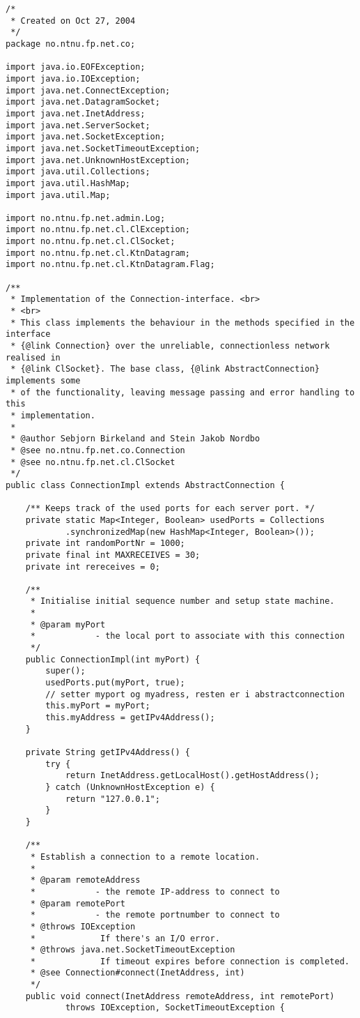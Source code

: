 \begin{lstlisting}
/*
 * Created on Oct 27, 2004
 */
package no.ntnu.fp.net.co;

import java.io.EOFException;
import java.io.IOException;
import java.net.ConnectException;
import java.net.DatagramSocket;
import java.net.InetAddress;
import java.net.ServerSocket;
import java.net.SocketException;
import java.net.SocketTimeoutException;
import java.net.UnknownHostException;
import java.util.Collections;
import java.util.HashMap;
import java.util.Map;

import no.ntnu.fp.net.admin.Log;
import no.ntnu.fp.net.cl.ClException;
import no.ntnu.fp.net.cl.ClSocket;
import no.ntnu.fp.net.cl.KtnDatagram;
import no.ntnu.fp.net.cl.KtnDatagram.Flag;

/**
 * Implementation of the Connection-interface. <br>
 * <br>
 * This class implements the behaviour in the methods specified in the interface
 * {@link Connection} over the unreliable, connectionless network realised in
 * {@link ClSocket}. The base class, {@link AbstractConnection} implements some
 * of the functionality, leaving message passing and error handling to this
 * implementation.
 * 
 * @author Sebjorn Birkeland and Stein Jakob Nordbo
 * @see no.ntnu.fp.net.co.Connection
 * @see no.ntnu.fp.net.cl.ClSocket
 */
public class ConnectionImpl extends AbstractConnection {

	/** Keeps track of the used ports for each server port. */
	private static Map<Integer, Boolean> usedPorts = Collections
			.synchronizedMap(new HashMap<Integer, Boolean>());
	private int randomPortNr = 1000;
	private final int MAXRECEIVES = 30;
	private int rereceives = 0;

	/**
	 * Initialise initial sequence number and setup state machine.
	 * 
	 * @param myPort
	 *            - the local port to associate with this connection
	 */
	public ConnectionImpl(int myPort) {
		super();
		usedPorts.put(myPort, true);
		// setter myport og myadress, resten er i abstractconnection
		this.myPort = myPort;
		this.myAddress = getIPv4Address();
	}

	private String getIPv4Address() {
		try {
			return InetAddress.getLocalHost().getHostAddress();
		} catch (UnknownHostException e) {
			return "127.0.0.1";
		}
	}

	/**
	 * Establish a connection to a remote location.
	 * 
	 * @param remoteAddress
	 *            - the remote IP-address to connect to
	 * @param remotePort
	 *            - the remote portnumber to connect to
	 * @throws IOException
	 *             If there's an I/O error.
	 * @throws java.net.SocketTimeoutException
	 *             If timeout expires before connection is completed.
	 * @see Connection#connect(InetAddress, int)
	 */
	public void connect(InetAddress remoteAddress, int remotePort)
			throws IOException, SocketTimeoutException {


\end{lstlisting}
